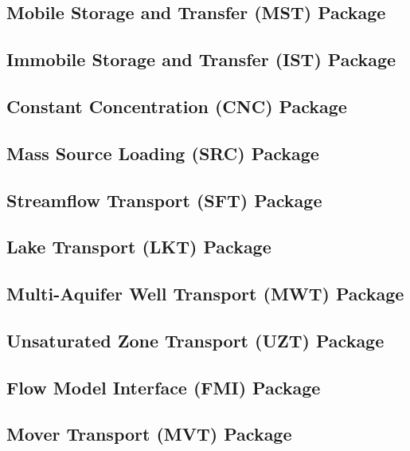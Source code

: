 \newpage
\subsection{Mobile Storage and Transfer (MST) Package}


\newpage
\subsection{Immobile Storage and Transfer (IST) Package}


\newpage
\subsection{Constant Concentration (CNC) Package}


\newpage
\subsection{Mass Source Loading (SRC) Package}


\newpage
\subsection{Streamflow Transport (SFT) Package}


\newpage
\subsection{Lake Transport (LKT) Package}


\newpage
\subsection{Multi-Aquifer Well Transport (MWT) Package}


\newpage
\subsection{Unsaturated Zone Transport (UZT) Package}


\newpage
\subsection{Flow Model Interface (FMI) Package}


\newpage
\subsection{Mover Transport (MVT) Package}



